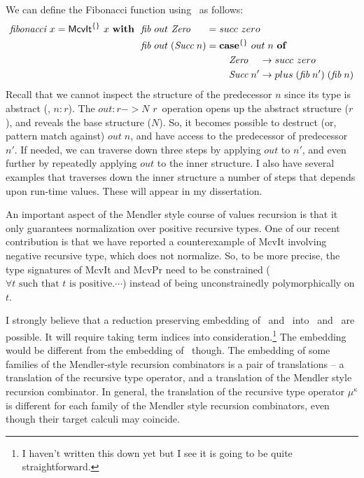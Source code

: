 We can define the Fibonacci function using \McvIt\ as follows:
\begin{align*}
\textit{fibonacci}~x = \textsf{McvIt}^{\{\}}~x~\textbf{with}~~
&  \textit{fib} ~out ~\textit{Zero}~~~~\; = succ~zero \\
&  \textit{fib} ~out \;(\textit{Succ}\;n) =
            \textbf{case}^{\{\}}~out\;n~\textbf{of} \\
&\qquad\qquad\qquad\qquad\quad
              \textit{Zero}~~~\, -> succ~zero \\
&\qquad\qquad\qquad\qquad\quad
              \textit{Succ}\;n'  -> plus\;(\textit{fib}\;n')\;(\textit{fib}\;n)
\end{align*}
Recall that we cannot inspect the structure of the predecessor $n$ since
its type is abstract (\ie, $n:r$). The $out : r -> \textit{N r}\,$ operation
opens up the abstract structure ($r$), and reveals the base structure ($N$).
So, it becomes possible to destruct (or, pattern match against) $out\;n$,
and have access to the predecessor of predecessor $n'$. If needed, we can
traverse down three steps by applying $out$ to $n'$, and even further by
repeatedly applying $out$ to the inner structure. I also have several examples
that traverses down the inner structure a number of steps that depends
upon run-time values. These will appear in my dissertation.

An important aspect of the Mendler style course of values recursion is that
it only guarantees normalization over positive recursive types. One of our
recent contribution is that we have reported a counterexample of \textsf{McvIt}
involving negative recursive type, which does not normalize. So, to be more
precise, the type signatures of \textsf{McvIt} and \textsf{McvPr} need to
be constrained ($\forall t \text{~such that~$t$ is positive}.\cdots$)
instead of being unconstrainedly polymorphically on $t$.

I strongly believe that a reduction preserving embedding of
\McvIt\ and \McvPr\ into \Fixw\, and \Fixi\ are possible. It
will require taking term indices into
consideration.\footnote{I haven't written this down yet but I see it
is going to be quite straightforward.} The embedding would be different from
the embedding of \MPr\ though. The embedding of some families of
the Mendler-style recursion combinators is a pair of translations --
a translation of the recursive type operator, and a translation of
the Mendler style recursion combinator. In general, the translation of
the recursive type operator $\mu^\kappa$ is different for each family
of the Mendler style recursion combinators, even though their target
calculi may coincide.

